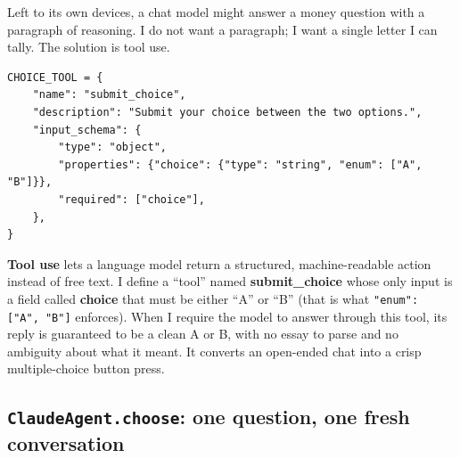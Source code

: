 \documentclass[11pt]{article}
\newcommand{\term}[1]{\textbf{\color{mossdk}#1}}
\newcommand{\file}[1]{\textbf{\ttfamily #1}}
\begin{document}
Left to its own devices, a chat model might answer a money question with a paragraph of reasoning. I
do not want a paragraph; I want a single letter I can tally. The solution is tool use.

\begin{lstlisting}[style=py,firstnumber=49]
CHOICE_TOOL = {
    "name": "submit_choice",
    "description": "Submit your choice between the two options.",
    "input_schema": {
        "type": "object",
        "properties": {"choice": {"type": "string", "enum": ["A", "B"]}},
        "required": ["choice"],
    },
}
\end{lstlisting}

\begin{defbox}
\term{Tool use} lets a language model return a structured, machine-readable action instead of free
text. I define a ``tool'' named \file{submit\_choice} whose only input is a field called \file{choice}
that must be either ``A'' or ``B'' (that is what \verb|"enum": ["A", "B"]| enforces). When I require
the model to answer through this tool, its reply is guaranteed to be a clean A or B, with no essay to
parse and no ambiguity about what it meant. It converts an open-ended chat into a crisp multiple-choice
button press.
\end{defbox}

\subsection{\texttt{ClaudeAgent.choose}: one question, one fresh conversation}
\end{document}

